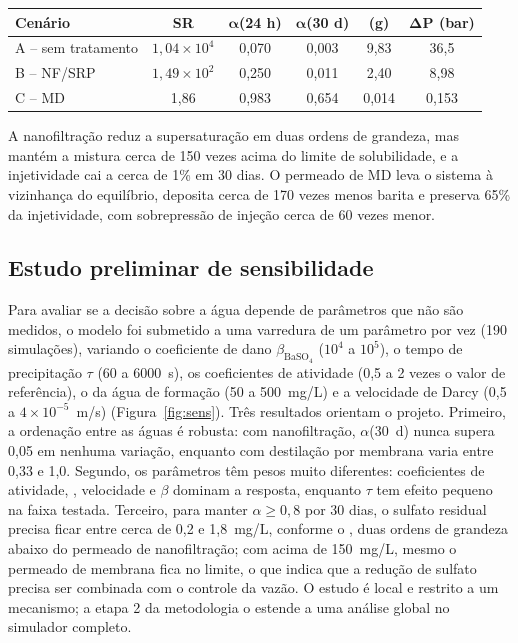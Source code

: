 \documentclass[11pt,a4paper]{article}
\begin{document}
\begin{center}
\small
\begin{tabularx}{\textwidth}{@{}lCCCCC@{}}
\toprule
\textbf{Cenário} & \textbf{SR} & $\boldsymbol{\alpha}$\textbf{(24 h)} & $\boldsymbol{\alpha}$\textbf{(30 d)} & \textbf{ (g)} & $\boldsymbol{\Delta P}$\textbf{ (bar)} \\
\midrule
A -- sem tratamento & $1{,}04\times10^{4}$ & 0,070 & 0,003 & 9,83 & 36,5 \\
B -- NF/SRP        & $1{,}49\times10^{2}$ & 0,250 & 0,011 & 2,40 & 8,98 \\
C -- MD            & 1,86                 & 0,983 & 0,654 & 0,014 & 0,153 \\
\bottomrule
\end{tabularx}
\end{center}


A nanofiltração reduz a supersaturação em duas ordens de grandeza, mas mantém a mistura
cerca de 150 vezes acima do limite de solubilidade, e a injetividade cai a cerca de 1\%
em 30 dias. O permeado de MD leva o sistema à vizinhança do equilíbrio, deposita cerca de
170 vezes menos barita e preserva 65\% da injetividade, com sobrepressão de injeção cerca
de 60 vezes menor.

\subsection{Estudo preliminar de sensibilidade}
Para avaliar se a decisão sobre a água depende de parâmetros que não são medidos, o modelo
foi submetido a uma varredura de um parâmetro por vez (190 simulações), variando o
coeficiente de dano $\beta_{\mathrm{BaSO_4}}$ ($10^4$ a $10^5$), o tempo de precipitação
$\tau$ (60 a 6000~s), os coeficientes de atividade (0,5 a 2 vezes o valor de referência), o
 da água de formação (50 a 500~mg/L) e a velocidade de Darcy (0,5 a
$4\times10^{-5}$~m/s) (Figura~\ref{fig:sens}). Três resultados orientam o projeto. Primeiro,
a ordenação entre as águas é robusta: com nanofiltração, $\alpha$(30~d) nunca supera 0,05
em nenhuma variação, enquanto com destilação por membrana varia entre 0,33 e 1,0. Segundo,
os parâmetros têm pesos muito diferentes: coeficientes de atividade, , velocidade e
$\beta$ dominam a resposta, enquanto $\tau$ tem efeito pequeno na faixa testada. Terceiro,
para manter $\alpha \ge 0{,}8$ por 30 dias, o sulfato residual precisa ficar entre cerca de
0,2 e 1,8~mg/L, conforme o , duas ordens de grandeza abaixo do permeado de
nanofiltração; com  acima de 150~mg/L, mesmo o permeado de membrana fica no
limite, o que indica que a redução de sulfato precisa ser combinada com o controle da
vazão. O estudo é local e restrito a um mecanismo; a etapa 2 da metodologia o estende a
uma análise global no simulador completo.
\end{document}
